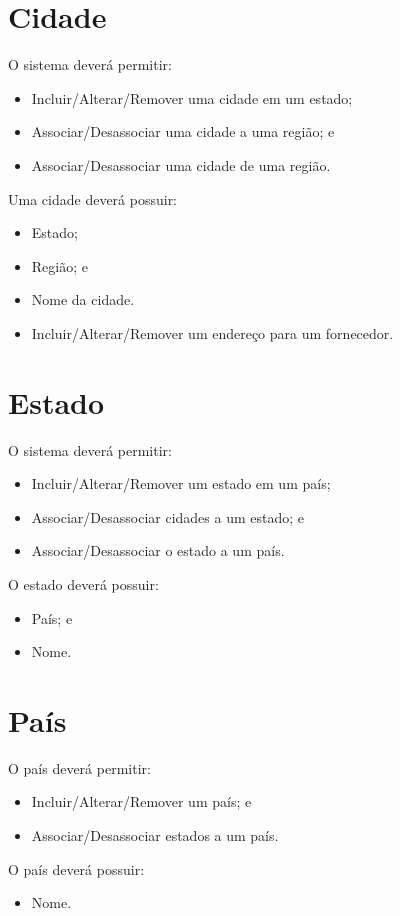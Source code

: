 \section{Cidade}

O sistema deverá permitir:

\begin{itemize}
	\item Incluir/Alterar/Remover uma cidade em um estado;
	\item Associar/Desassociar uma cidade a uma região; e
	\item Associar/Desassociar uma cidade de uma região.
\end{itemize}

Uma cidade deverá possuir:

\begin{itemize}
	\item Estado;
	\item Região; e
	\item Nome da cidade.
	\item Incluir/Alterar/Remover um endereço para um fornecedor.
\end{itemize}

\section{Estado}

O sistema deverá permitir:

\begin{itemize}
	\item Incluir/Alterar/Remover um estado em um país;
	\item Associar/Desassociar cidades a um estado; e
	\item Associar/Desassociar o estado a um país.
\end{itemize}

O estado deverá possuir:

\begin{itemize}
	\item País; e
	\item Nome.
\end{itemize}

\section{País}

O país deverá permitir:

\begin{itemize}
	\item Incluir/Alterar/Remover um país; e
	\item Associar/Desassociar estados a um país.
\end{itemize}

O país deverá possuir:

\begin{itemize}
	\item Nome.
\end{itemize}